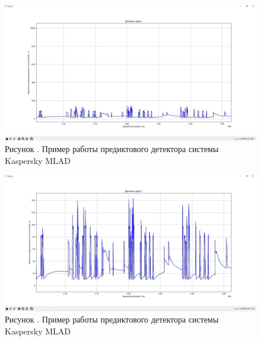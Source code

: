      \begin{figure}
  	\centering
  	\def\svgwidth{\textwidth}
  	\includegraphics[scale=0.6]{images/data_1_visual_3.jpg}
  	\caption*{\gostFont Рисунок \thechaptercntr .\theimagecntr \spc {--} Пример работы предиктового детектора системы Kaspersky MLAD}
  	\label{fig:MLADBlackBox}
  \end{figure} \addtocounter{imagecntr}{1}
  
     \begin{figure}
  	\centering
  	\def\svgwidth{\textwidth}
  	\includegraphics[scale=0.6]{images/data_1_visual_4.jpg}
  	\caption*{\gostFont Рисунок \thechaptercntr .\theimagecntr \spc {--} Пример работы предиктового детектора системы Kaspersky MLAD}
  	\label{fig:MLADBlackBox}
  \end{figure} \addtocounter{imagecntr}{1}
  
